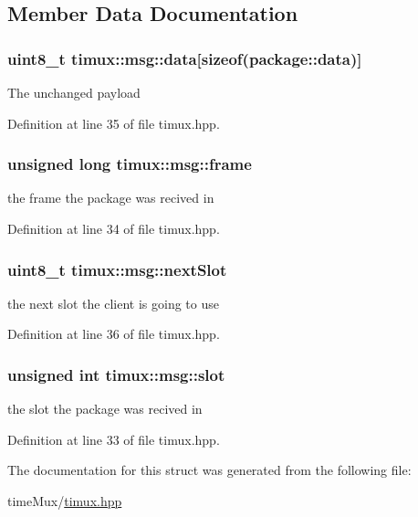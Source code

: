 \subsection{Member Data Documentation}
\hypertarget{structtimux_1_1msg_af27ad97558c3e1bcb2a8adde1cf25db6}{
\subsubsection[{data}]{\setlength{\rightskip}{0pt plus 5cm}uint8\+\_\+t timux\+::msg\+::data\mbox{[}sizeof(package\+::data)\mbox{]}}}\label{structtimux_1_1msg_af27ad97558c3e1bcb2a8adde1cf25db6}
The unchanged payload 

Definition at line 35 of file timux.\+hpp.

\hypertarget{structtimux_1_1msg_afe8a25b0d19b93d45bfb4326c423230d}{
\subsubsection[{frame}]{\setlength{\rightskip}{0pt plus 5cm}unsigned long timux\+::msg\+::frame}}\label{structtimux_1_1msg_afe8a25b0d19b93d45bfb4326c423230d}


the frame the package was recived in 



Definition at line 34 of file timux.\+hpp.

\hypertarget{structtimux_1_1msg_ac5e20000d09f9356645ce25a522466cf}{
\subsubsection[{next\+Slot}]{\setlength{\rightskip}{0pt plus 5cm}uint8\+\_\+t timux\+::msg\+::next\+Slot}}\label{structtimux_1_1msg_ac5e20000d09f9356645ce25a522466cf}


the next slot the client is going to use 



Definition at line 36 of file timux.\+hpp.

\hypertarget{structtimux_1_1msg_a481b3c7ec060f879e5ed008d71b4cdde}{
\subsubsection[{slot}]{\setlength{\rightskip}{0pt plus 5cm}unsigned int timux\+::msg\+::slot}}\label{structtimux_1_1msg_a481b3c7ec060f879e5ed008d71b4cdde}


the slot the package was recived in 



Definition at line 33 of file timux.\+hpp.



The documentation for this struct was generated from the following file\+:\begin{DoxyCompactItemize}
\item 
time\+Mux/\hyperlink{timux_8hpp}{timux.\+hpp}\end{DoxyCompactItemize}
